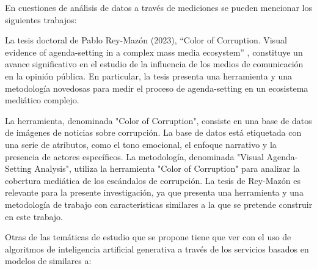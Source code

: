 \documentclass[12pt]{article}
\begin{document}
En cuestiones de análisis de datos a través de mediciones se pueden mencionar los siguientes trabajos: 


La tesis doctoral de Pablo Rey-Mazón (2023), ``Color of Corruption. Visual evidence of agenda-setting in a complex mass media ecosystem'' \cite{mazon:2023}, constituye un avance significativo en el estudio de la influencia de los medios de comunicación en la opinión pública. En particular, la tesis presenta una herramienta y una metodología novedosas para medir el proceso de agenda-setting en un ecosistema mediático complejo.

La herramienta, denominada "Color of Corruption", consiste en una base de datos de imágenes de noticias sobre corrupción. La base de datos está etiquetada con una serie de atributos, como el tono emocional, el enfoque narrativo y la presencia de actores específicos. La metodología, denominada "Visual Agenda-Setting Analysis", utiliza la herramienta "Color of Corruption" para analizar la cobertura mediática de los escándalos de corrupción. La tesis de Rey-Mazón es relevante para la presente investigación, ya que presenta una herramienta y una metodología de trabajo con características similares a la que se pretende construir en este trabajo. 

Otras de las temáticas de estudio que se propone tiene que ver con el uso de algoritmos de inteligencia artificial generativa a través de los servicios basados en modelos de similares a:  
\end{document}
